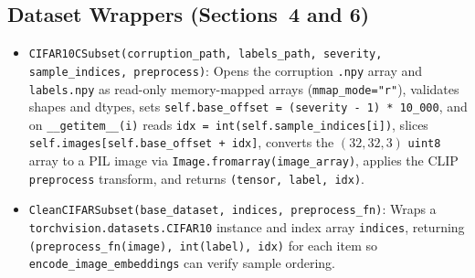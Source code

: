 \documentclass[11pt,a4paper]{article}
\begin{document}
\subsection{Dataset Wrappers (Sections~4 and 6)}
\begin{itemize}
  \item \texttt{CIFAR10CSubset(corruption\_\allowbreak{}path, labels\_\allowbreak{}path, severity, sample\_\allowbreak{}indices, preprocess)}: Opens the corruption \texttt{.npy} array and \texttt{labels.npy} as read-only memory-mapped arrays (\texttt{mmap\_\allowbreak{}mode="r"}), validates shapes and dtypes, sets \texttt{self.base\_\allowbreak{}offset = (severity - 1) * 10\_\allowbreak{}000}, and on \texttt{\_\allowbreak{}\_\allowbreak{}getitem\_\allowbreak{}\_\allowbreak{}(i)} reads \texttt{idx = int(self.sample\_\allowbreak{}indices[i])}, slices \texttt{self.images[self.base\_\allowbreak{}offset + idx]}, converts the $(32, 32, 3)$ \texttt{uint8} array to a PIL image via \texttt{Image.fromarray(image\_\allowbreak{}array)}, applies the CLIP \texttt{preprocess} transform, and returns \texttt{(tensor, label, idx)}.
  \item \texttt{CleanCIFARSubset(base\_\allowbreak{}dataset, indices, preprocess\_\allowbreak{}fn)}: Wraps a \texttt{torchvision.datasets.CIFAR10} instance and index array \texttt{indices}, returning \texttt{(preprocess\_\allowbreak{}fn(image), int(label), idx)} for each item so \texttt{encode\_\allowbreak{}image\_\allowbreak{}embeddings} can verify sample ordering.
\end{itemize}
\end{document}
